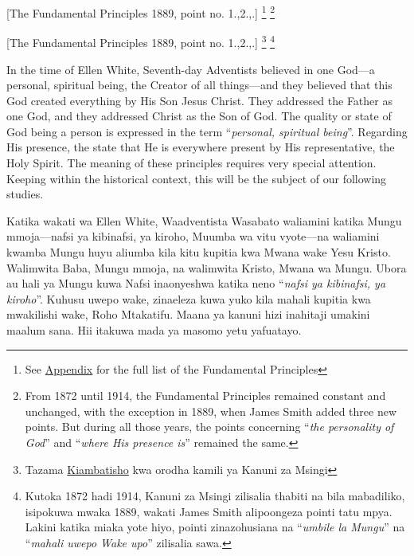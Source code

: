 

[The Fundamental Principles 1889, point no. 1.,2.,.] \footnote{See \hyperref[chap:appendix]{Appendix} for the full list of the Fundamental Principles} \footnote{From 1872 until 1914, the Fundamental Principles remained constant and unchanged, with the exception in 1889, when James Smith added three new points. But during all those years, the points concerning “\textit{the personality of God}” and “\textit{where His presence is}” remained the same. }


[The Fundamental Principles 1889, point no. 1.,2.,.] \footnote{Tazama \hyperref[chap:appendix]{Kiambatisho} kwa orodha kamili ya Kanuni za Msingi} \footnote{Kutoka 1872 hadi 1914, Kanuni za Msingi zilisalia thabiti na bila mabadiliko, isipokuwa mwaka 1889, wakati James Smith alipoongeza pointi tatu mpya. Lakini katika miaka yote hiyo, pointi zinazohusiana na “\textit{umbile la Mungu}” na “\textit{mahali uwepo Wake upo}” zilisalia sawa.}


In the time of Ellen White, Seventh-day Adventists believed in one God—a personal, spiritual being, the Creator of all things—and they believed that this God created everything by His Son Jesus Christ. They addressed the Father as one God, and they addressed Christ as the Son of God. The quality or state of God being a person is expressed in the term “\textit{personal, spiritual being}”. Regarding His presence, the  state that He is everywhere present by His representative, the Holy Spirit. The meaning of these principles requires very special attention. Keeping within the historical context, this will be the subject of our following studies.


Katika wakati wa Ellen White, Waadventista Wasabato waliamini katika Mungu mmoja—nafsi ya kibinafsi, ya kiroho, Muumba wa vitu vyote—na waliamini kwamba Mungu huyu aliumba kila kitu kupitia kwa Mwana wake Yesu Kristo. Walimwita Baba, Mungu mmoja, na walimwita Kristo, Mwana wa Mungu. Ubora au hali ya Mungu kuwa Nafsi inaonyeshwa katika neno “\textit{nafsi ya kibinafsi, ya kiroho}”. Kuhusu uwepo wake,  zinaeleza kuwa yuko kila mahali kupitia kwa mwakilishi wake, Roho Mtakatifu. Maana ya kanuni hizi inahitaji umakini maalum sana. Hii itakuwa mada ya masomo yetu yafuatayo.


